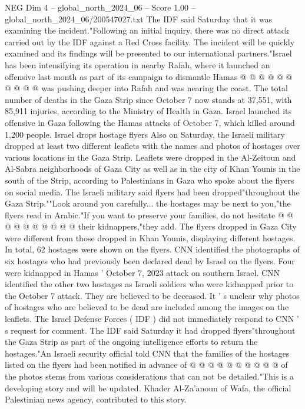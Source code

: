 \begin{textsample}{NEG Dim 4 – global\_north\_2024\_06 – Score 1.00 – global\_north\_2024\_06/200547027.txt}
The IDF said Saturday that it was examining the incident."Following an initial inquiry, there was no direct attack carried out by the IDF against a Red Cross facility.
The incident will be quickly examined and its findings will be presented to our international partners."Israel has been intensifying its operation in nearby Rafah, where it launched an offensive last month as part of its campaign to dismantle Hamas @ @ @ @ @ @ @ @ @ @ was pushing deeper into Rafah and was nearing the coast.
The total number of deaths in the Gaza Strip since October 7 now stands at 37,551, with 85,911 injuries, according to the Ministry of Health in Gaza.
Israel launched its offensive in Gaza following the Hamas attacks of October 7, which killed around 1,200 people.
Israel drops hostage flyers Also on Saturday, the Israeli military dropped at least two different leaflets with the names and photos of hostages over various locations in the Gaza Strip.
Leaflets were dropped in the Al-Zeitoun and Al-Sabra neighborhoods of Gaza City as well as in the city of Khan Younis in the south of the Strip, according to Palestinians in Gaza who spoke about the flyers on social media.
The Israeli military said flyers had been dropped"throughout the Gaza Strip.""Look around you carefully... the hostages may be next to you,"the flyers read in Arabic."If you want to preserve your families, do not hesitate @ @ @ @ @ @ @ @ @ @ their kidnappers,"they add.
The flyers dropped in Gaza City were different from those dropped in Khan Younis, displaying different hostages.
In total, 62 hostages were shown on the flyers.
CNN identified the photographs of six hostages who had previously been declared dead by Israel on the flyers.
Four were kidnapped in Hamas ' October 7, 2023 attack on southern Israel.
CNN identified the other two hostages as Israeli soldiers who were kidnapped prior to the October 7 attack.
They are believed to be deceased.
It ' s unclear why photos of hostages who are believed to be dead are included among the images on the leaflets.
The Israel Defense Forces ( IDF ) did not immediately respond to CNN ' s request for comment.
The IDF said Saturday it had dropped flyers"throughout the Gaza Strip as part of the ongoing intelligence efforts to return the hostages."An Israeli security official told CNN that the families of the hostages listed on the flyers had been notified in advance of @ @ @ @ @ @ @ @ @ @ of the photos stems from various considerations that can not be detailed."This is a developing story and will be updated.
Khader Al-Za'anoun of Wafa, the official Palestinian news agency, contributed to this story.

\end{textsample}
